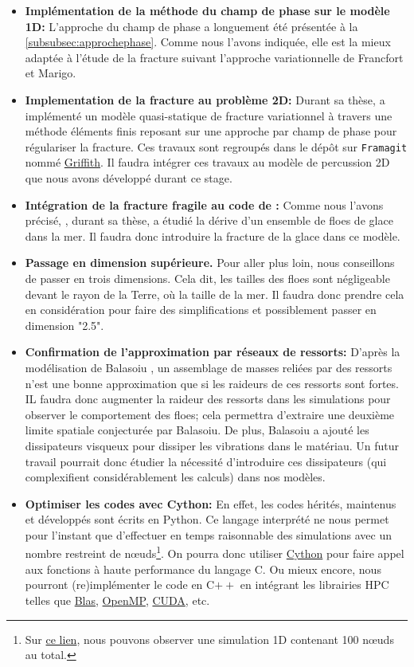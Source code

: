 \begin{itemize}
    \item \textbf{Implémentation de la méthode du champ de phase sur le modèle 1D:} L'approche du champ de phase a longuement été présentée à la \cref{subsubsec:approchephase}. Comme nous l'avons indiquée, elle est la mieux adaptée à l'étude de la fracture suivant l'approche variationnelle de Francfort et Marigo.
    \item \textbf{Implementation de la fracture au problème 2D:} Durant sa thèse, \citeauthor{balasoiu2020halthesis} a implémenté un modèle quasi-statique de fracture variationnel à travers une méthode éléments finis reposant sur une approche par champ de phase pour régulariser la fracture. Ces travaux sont regroupés dans le dépôt sur \texttt{Framagit} nommé \href{https://framagit.org/RaK/Griffith}{Griffith}. Il faudra intégrer ces travaux au modèle de percussion 2D que nous avons développé durant ce stage.
    \item \textbf{Intégration de la fracture fragile au code de \citeauthor{rabatel2015thesis}:} Comme nous l'avons précisé, \citeauthor{rabatel2015thesis}, durant sa thèse, a étudié la dérive d'un ensemble de floes de glace dans la mer. Il faudra donc introduire la fracture de la glace dans ce modèle.
    \item \textbf{Passage en dimension supérieure.} Pour aller plus loin, nous conseillons de passer en trois dimensions. Cela dit, les tailles des floes sont négligeable devant le rayon de la Terre, où la taille de la mer. Il faudra donc prendre cela en considération pour faire des simplifications et possiblement passer en dimension "2.5".
    \item \textbf{Confirmation de l'approximation par réseaux de ressorts:} D'après la modélisation de Balasoiu \parencite{balasoiu2020halthesis}, un assemblage de masses reliées par des ressorts n'est une bonne approximation que si les raideurs de ces ressorts sont fortes. IL faudra donc augmenter la raideur des ressorts dans les simulations pour observer le comportement des floes; cela permettra d'extraire une deuxième limite spatiale conjecturée par Balasoiu. De plus, Balasoiu a ajouté les dissipateurs visqueux pour dissiper les vibrations dans le matériau. Un futur travail pourrait donc étudier la nécessité d'introduire ces dissipateurs (qui complexifient considérablement les calculs) dans nos modèles.  
    \item \textbf{Optimiser les codes avec Cython:} En effet, les codes hérités, maintenus et développés sont écrits en Python. Ce langage interprété ne nous permet pour l'instant que d'effectuer en temps raisonnable des simulations avec un nombre restreint de n\oe{}uds\footnote{Sur \href{https://seafile.unistra.fr/f/2c47bde2ca014e2bb02c/}{ce lien}, nous pouvons observer une simulation 1D contenant 100 n\oe{}uds au total.}. On pourra donc utiliser \href{https://cython.org/}{Cython} pour faire appel aux fonctions à haute performance du langage C. Ou mieux encore, nous pourront (re)implémenter le code en C$++$ en intégrant les librairies HPC telles que \href{http://www.netlib.org/blas/}{Blas}, \href{https://www.openmp.org/}{OpenMP}, \href{https://developer.nvidia.com/cuda-zone}{CUDA}, etc.

\end{itemize}
